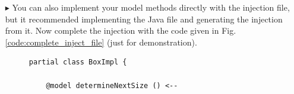 \begin{enumerate}
    []{Java}{
        morekeywords={partial, class},
        sensitive=false,
        keywordstyle={\bfseries\color{purple}},
        emph={@model},
        emphstyle={\color{blue}},
        backgroundcolor=\color{white}
    }

    \begin{figure}[htbp]
        \centering
        \begin{lstlisting}[language=Injection]
    partial class BoxImpl {

        @model determineNextSize () <--


                // TODO: implement this method here but do not remove the injection marker
                throw new UnsupportedOperationException();
        -->

        @model addToStringRep (Card card) <--

                StringBuilder sb = new StringBuilder();

                if (stringRep == null)
                {
                    sb.append("BoxContent: [");

                }
                else
                {
                    sb.append(stringRep);
                    sb.append(", [");
                }

                sb.append(card.getFace());
                sb.append(", ");
                sb.append(card.getBack());
                sb.append("]");

                stringRep = sb.toString();
        -->

    }
        \end{lstlisting}
        \caption{Generated injection file}
        \label{code:generated_inject_file}
    \end{figure}
    \FloatBarrier

	\clearpage
    \item[$\blacktriangleright$] You can also implement your model methods directly with the injection file, but it recommended implementing the Java file and generating the injection from it. Now complete the injection with the code given in Fig. \ref{code:complete_inject_file} (just for demonstration).

    \begin{figure}[htbp]
        \centering
        \begin{lstlisting}[language=Injection]
partial class BoxImpl {

    @model determineNextSize () <--


\end{lstlisting}
\end{figure}
\end{enumerate}
